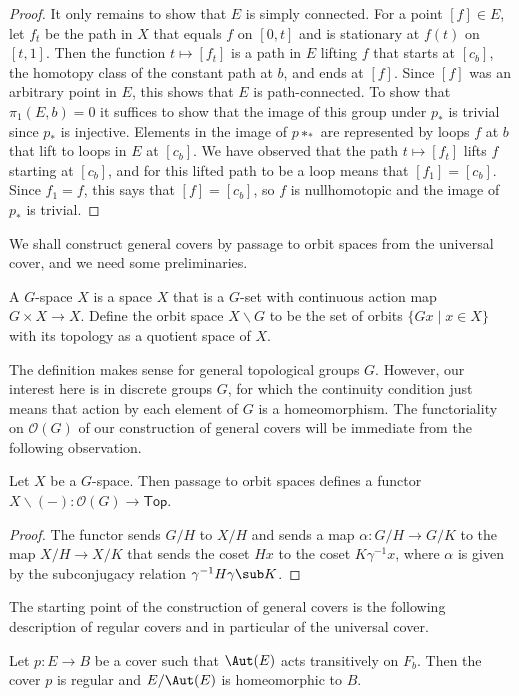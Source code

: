 \begin{proof}
It only remains to show that $E$ is simply connected. For a point $[f]\in E$, let $f_t$ be the path in $X$ that equals $f$ on $[0,t]$ and is stationary at $f(t)$ on $[t,1]$. Then the function $t\mapsto[f_t]$ is a path in $E$ lifting $f$ that starts at $[c_b]$, the homotopy class of the constant path at $b$, and ends at $[f]$. Since $[f]$ was an arbitrary point in $E$, this shows that $E$ is path-connected. To show that $\pi_1(E,b)=0$ it suffices to show that the image of this group under $p_*$ is trivial since $p_*$ is injective. Elements in the image of $p∗_*$ are represented by loops $f$ at $b$ that lift to loops in $E$ at $[c_b]$. We have observed that the path $t\mapsto[f_t]$ lifts $f$ starting at $[c_b]$, and for this lifted path to be a loop means that $[f_1]=[c_b]$. Since $f_1=f$, this says that $[f]=[c_b]$, so $f$ is nullhomotopic and the image of $p_*$ is trivial.
\end{proof}
We shall construct general covers by passage to orbit spaces from the universal
cover, and we need some preliminaries.
\begin{definition}
A $G$-space $X$ is a space $X$ that is a $G$-set with continuous action map $G\times X\to X$. Define the orbit space $X\backslash G$ to be the set of orbits $\{Gx\mid x\in X\}$ with its topology as a quotient space of $X$.
\end{definition}
The definition makes sense for general topological groups $G$. However, our
interest here is in discrete groups $G$, for which the continuity condition just means that action by each element of $G$ is a homeomorphism. The functoriality on $\mathcal{O}(G)$ of our construction of general covers will be immediate from the following observation.
\begin{lemma}
Let $X$ be a $G$-space. Then passage to orbit spaces defines a functor $X\backslash(-):\mathcal{O}(G)\to\mathsf{Top}$.
\end{lemma}
\begin{proof}
The functor sends $G/H$ to $X/H$ and sends a map $\alpha:G/H\to G/K$ to the map $X/H\to X/K$ that sends the coset $Hx$ to the coset $K\gamma^{-1}x$, where $\alpha$ is given by the subconjugacy relation $\gamma^{-1}H\gamma\sub K$.
\end{proof}
The starting point of the construction of general covers is the following description of regular covers and in particular of the universal cover.
\begin{proposition}
Let $p:E\to B$ be a cover such that $\Aut(E)$ acts transitively on $F_b$. Then the cover $p$ is regular and $E/\Aut(E)$ is homeomorphic to $B$.
\end{proposition}
